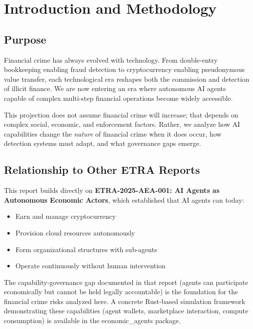 \documentclass[11pt,letterpaper]{article}
\begin{document}
\vspace{0.8cm}

\section{Introduction and Methodology}

\subsection{Purpose}

Financial crime has always evolved with technology. From double-entry bookkeeping enabling fraud detection to cryptocurrency enabling pseudonymous value transfer, each technological era reshapes both the commission and detection of illicit finance. We are now entering an era where autonomous AI agents capable of complex multi-step financial operations become widely accessible.

This projection does not assume financial crime will increase; that depends on complex social, economic, and enforcement factors. Rather, we analyze how AI capabilities change the \textit{nature} of financial crime when it does occur, how detection systems must adapt, and what governance gaps emerge.

\subsection{Relationship to Other ETRA Reports}

This report builds directly on \textbf{ETRA-2025-AEA-001: AI Agents as Autonomous Economic Actors}, which established that AI agents can today:
\begin{itemize}
  \item Earn and manage cryptocurrency
  \item Provision cloud resources autonomously
  \item Form organizational structures with sub-agents
  \item Operate continuously without human intervention
\end{itemize}

The capability-governance gap documented in that report (agents can participate economically but cannot be held legally accountable) is the foundation for the financial crime risks analyzed here. A concrete Rust-based simulation framework demonstrating these capabilities (agent wallets, marketplace interaction, compute consumption) is available in the economic\_agents package.
\end{document}
